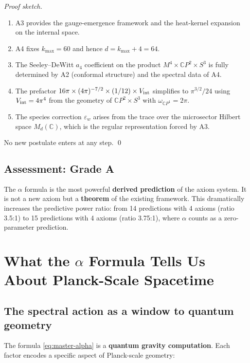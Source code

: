 \documentclass[11pt,a4paper]{article}
\newcommand{\CP}{\mathbb{C}P}
\begin{document}
\begin{proof}[Proof sketch]
\begin{enumerate}
\item A3 provides the gauge-emergence framework and the heat-kernel expansion on the internal space.
\item A4 fixes $k_{\max} = 60$ and hence $d = k_{\max} + 4 = 64$.
\item The Seeley--DeWitt $a_4$ coefficient on the product $M^4 \times \CP^2 \times S^3$ is fully determined by A2 (conformal structure) and the spectral data of A4.
\item The prefactor $16\pi \times (4\pi)^{-7/2} \times (1/12) \times V_{\rm int}$ simplifies to $\pi^{3/2}/24$ using $V_{\rm int} = 4\pi^4$ from the geometry of $\CP^2 \times S^3$ with $\omega_{\CP^1} = 2\pi$.
\item The species correction $\varepsilon_w$ arises from the trace over the microsector Hilbert space $M_d(\mathbb{C})$, which is the regular representation forced by A3.
\end{enumerate}
No new postulate enters at any step. \qed
\end{proof}

\subsection{Assessment: Grade A}

The $\alpha$ formula is the most powerful \textbf{derived prediction} of the axiom system. It is not a new axiom but a \textbf{theorem} of the existing framework. This dramatically increases the predictive power ratio: from 14 predictions with 4 axioms (ratio 3.5:1) to 15 predictions with 4 axioms (ratio 3.75:1), where $\alpha$ counts as a zero-parameter prediction.

\section{What the $\alpha$ Formula Tells Us About Planck-Scale Spacetime}

\subsection{The spectral action as a window to quantum geometry}

The formula \eqref{eq:master-alpha} is a \textbf{quantum gravity computation}. Each factor encodes a specific aspect of Planck-scale geometry:
\end{document}
